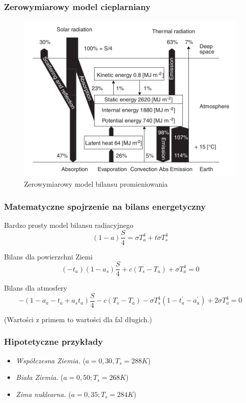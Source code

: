 \documentclass{beamer}
\begin{document}
\begin{frame}
	\frametitle{Zerowymiarowy model cieplarniany}
	\begin{figure}[h]
		\begin{center}
			\includegraphics[width=0.7\linewidth]{images/0D_Model.png}
			\caption{Zerowymiarowy model bilansu promieniowania}
		\end{center}
	\end{figure}

\end{frame}



\begin{frame}
	\frametitle{Matematyczne spojrzenie na bilans energetyczny}
	\begin{block}{Bardzo prosty model bilansu radiacyjnego}
		\[(1-a)\frac{S}{4} = \sigma T_a^4 + t\sigma T_s^4
		\]
	\end{block}
	\begin{block}{Bilans dla powierzchni Ziemi}
		\[(-t_a)(1-a_s)\frac{S}{4}+c(T_s - T_a)+\sigma T_a^4 =0
		\]
	\end{block}
	\begin{block}{Bilans dla atmosfery}
		\[-(1- a_a-t_a+a_st_a)\frac{S}{4} - c(T_s - T_a) - \sigma T_s^4
		(1-t_a^{'}-a_a^{'}) + 2\sigma T_a^4=0
		\]
	\end{block}
	\scriptsize{(Wartości z primem to wartości dla fal długich.)}
	
\end{frame}

\begin{frame}
	\frametitle{Hipotetyczne przykłady}
	\begin{itemize}
		\item \textit{Współczesna Ziemia.} ($a=0,30, T_s=288K$)
		\item \textit{Biała Ziemia.} ($a = 0,50;T_s=268K$)
		\item \textit{Zima nuklearna.} ($a=0,35; T_s=284K$)
	\end{itemize}
	
\end{frame}
\end{document}
